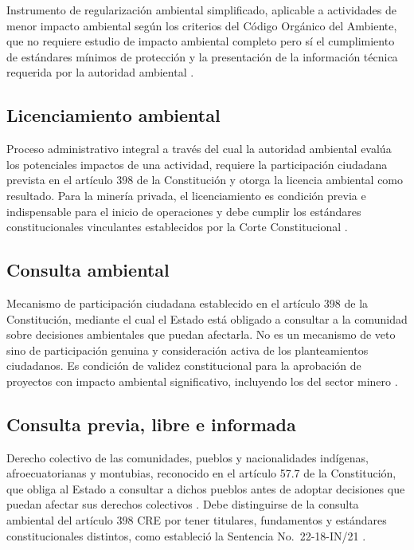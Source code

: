 Instrumento de regularización ambiental simplificado, aplicable a actividades de menor impacto ambiental según los criterios del Código Orgánico del Ambiente, que no requiere estudio de impacto ambiental completo pero sí el cumplimiento de estándares mínimos de protección y la presentación de la información técnica requerida por la autoridad ambiental \parencite{coa_2017}.

\subsection{Licenciamiento ambiental}

Proceso administrativo integral a través del cual la autoridad ambiental evalúa los potenciales impactos de una actividad, requiere la participación ciudadana prevista en el artículo 398 de la Constitución y otorga la licencia ambiental como resultado. Para la minería privada, el licenciamiento es condición previa e indispensable para el inicio de operaciones y debe cumplir los estándares constitucionales vinculantes establecidos por la Corte Constitucional \parencite{coa_2017,cce_1149_19_jp_21}.

\subsection{Consulta ambiental}

Mecanismo de participación ciudadana establecido en el artículo 398 de la Constitución, mediante el cual el Estado está obligado a consultar a la comunidad sobre decisiones ambientales que puedan afectarla. No es un mecanismo de veto sino de participación genuina y consideración activa de los planteamientos ciudadanos. Es condición de validez constitucional para la aprobación de proyectos con impacto ambiental significativo, incluyendo los del sector minero \parencite{cre_2008,cce_1149_19_jp_21}.

\subsection{Consulta previa, libre e informada}

Derecho colectivo de las comunidades, pueblos y nacionalidades indígenas, afroecuatorianas y montubias, reconocido en el artículo 57.7 de la Constitución, que obliga al Estado a consultar a dichos pueblos antes de adoptar decisiones que puedan afectar sus derechos colectivos \parencite{cre_2008}. Debe distinguirse de la consulta ambiental del artículo 398 CRE por tener titulares, fundamentos y estándares constitucionales distintos, como estableció la Sentencia No.\ 22-18-IN/21 \parencite{cce_22_18_in_21}.

